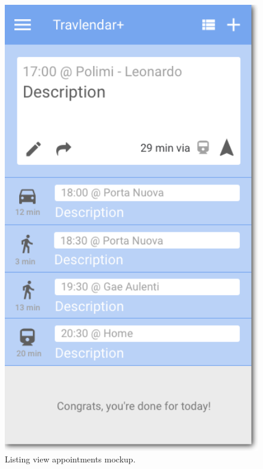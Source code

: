 \begin{figure}
	\centering
	\includegraphics[width=4.5in]{./images/listing.png}
	\caption{Listing view appointments mockup.}
	\label{fig:MockupListing}
\end{figure}
